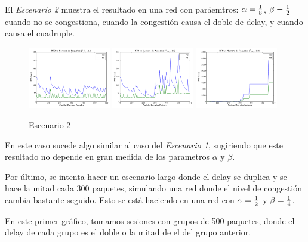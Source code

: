         El \emph{Escenario 2} muestra el resultado en una red con
        par\'aemtros: $\alpha={{1}\over{8}}$, $\beta={{1}\over{2}}$ 
        cuando no se congestiona, cuando la congesti\'on causa el doble de
        delay, y cuando causa el cuadruple.

        \begin{figure}[H]
            \center
	        
		    \includegraphics[width=0.32\textwidth]{imagenes/congestionb_1.pdf}
		    \includegraphics[width=0.32\textwidth]{imagenes/congestionb_2.pdf}
		    \includegraphics[width=0.32\textwidth]{imagenes/congestionb_4.pdf}

            \caption*{Escenario 2}
	
        \end{figure}          

		En este caso sucede algo similar al caso del \emph{Escenario 1},
		sugiriendo que este resultado no depende en gran medida de los
		parametros $\alpha$ y $\beta$.

		\hspace{1em}

		Por \'ultimo, se intenta hacer un escenario largo donde el delay se
		duplica y se hace la mitad cada 300 paquetes, simulando una red donde
		el nivel de congesti\'on cambia bastante seguido. Esto se est\'a
		haciendo en una red con $\alpha = {{1}\over{2}}$ y $\beta =
		{{1}\over{4}}$.

		En este primer gr\'afico, tomamos sesiones con grupos de 500 paquetes,
		donde el delay de cada grupo es el doble o la mitad de el del grupo
		anterior.

